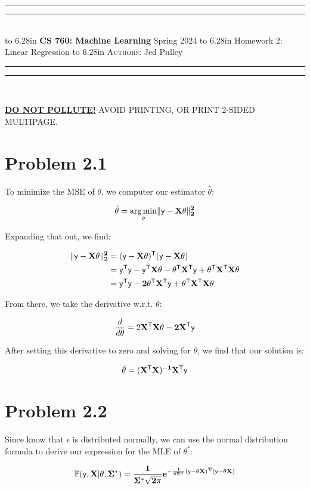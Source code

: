 \documentclass{article}
\newcommand{\lecture}[2]{
\pagestyle{myheadings}
\thispagestyle{plain}
\newpage
\noindent
\begin{center}
\rule{\textwidth}{1.6pt}\vspace*{-\baselineskip}\vspace*{2pt} %
\rule{\textwidth}{0.4pt}\\[1\baselineskip] %
\vbox{\vspace{2mm}
\hbox to 6.28in { {\bf CS 760: Machine Learning} \hfill Spring 2024 }
\vspace{4mm}
\hbox to 6.28in { {\Large \hfill #1  \hfill} }
\vspace{4mm}
\hbox to 6.28in { {\scshape Authors:}  #2 \hfill }}
\vspace{-2mm}
\rule{\textwidth}{0.4pt}\vspace*{-\baselineskip}\vspace{3.2pt} %
\rule{\textwidth}{1.6pt}\\[\baselineskip] %
\end{center}
\vspace*{4mm}
}
\begin{document}
\lecture{Homework 2: Linear Regression}{Jed Pulley}

\begin{center}
{\Large {\sf \underline{\textbf{DO NOT POLLUTE!}} AVOID PRINTING, OR PRINT 2-SIDED MULTIPAGE.}}
\end{center}

\section*{Problem 2.1}

To minimize the MSE of $\theta$, we computer our estimator $\hat{\theta}$:

\[\hat{\theta} = \underset{\theta}{\arg\min} \Vert \bf{\sf{y}}  - \bf{X}  \theta \Vert ^2_2 \]

Expanding that out, we find:

\begin{align*}
  \Vert \bf{\sf{y}}  - \bf{X}  \theta \Vert ^2_2 
  & = (\bf{\sf{y}} - \bf{X}  {\theta})^{\sf{T}}(\bf{\sf{y}} - \bf{X}  {\theta}) \\
  & = \bf{\sf{y}}^{\sf{T}}\bf{\sf{y}} - \bf{\sf{y}}^{\sf{T}}\bf{X}{\theta} - {\theta}^{\sf{T}}\bf{X}^{\sf{T}}\bf{\sf{y}} + {\theta}^{\sf{T}}\bf{X}^{\sf{T}}\bf{X}{\theta} \\
  & = \bf{\sf{y}}^{\sf{T}}\bf{\sf{y}} - 2{\theta}^{\sf{T}}\bf{X}^{\sf{T}}\bf{\sf{y}} + {\theta}^{\sf{T}}\bf{X}^{\sf{T}}\bf{X}{\theta}
\end{align*}

From there, we take the derivative w.r.t. $\theta$:

\begin{align*}
  \frac{d}{d\theta} = 2\bf{X}^{\sf{T}}\bf{X}{\theta} - 2\bf{X}^{\sf{T}}\bf{\sf{y}}
\end{align*}

After setting this derivative to zero and solving for $\theta$, we find that our solution is:

\[\hat{\theta} = (\bf{X}^{\sf{T}}\bf{X})^{-1}\bf{X}^{\sf{T}}\bf{\sf{y}}\]

\section*{Problem 2.2}

Since know that $\epsilon$ is distributed normally, we can use the normal distribution formula to derive our expression for the MLE of $\theta^{*}$:

\begin{align*}
  \mathbb{P}(\sf{y}, \bf{X} | \theta,\Sigma^{*}) = \frac{1}{{\Sigma^{*} \sqrt {2\pi } }}e^{-\frac{1}{2\Sigma^*}(\sf{y} - \theta \bf{X})^T(\sf{y} - \theta \bf{X})}
\end{align*}
\end{document}
